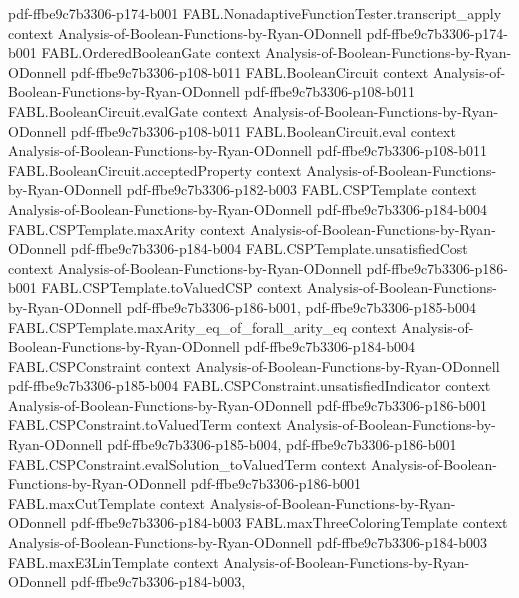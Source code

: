 \begin{theorem}
  {pdf-ffbe9c7b3306-p174-b001}
\proofstep
  {FABL.NonadaptiveFunctionTester.transcript_apply}
  {context}
  {Analysis-of-Boolean-Functions-by-Ryan-ODonnell}
  {pdf-ffbe9c7b3306-p174-b001}
\proofstep
  {FABL.OrderedBooleanGate}
  {context}
  {Analysis-of-Boolean-Functions-by-Ryan-ODonnell}
  {pdf-ffbe9c7b3306-p108-b011}
\proofstep
  {FABL.BooleanCircuit}
  {context}
  {Analysis-of-Boolean-Functions-by-Ryan-ODonnell}
  {pdf-ffbe9c7b3306-p108-b011}
\proofstep
  {FABL.BooleanCircuit.evalGate}
  {context}
  {Analysis-of-Boolean-Functions-by-Ryan-ODonnell}
  {pdf-ffbe9c7b3306-p108-b011}
\proofstep
  {FABL.BooleanCircuit.eval}
  {context}
  {Analysis-of-Boolean-Functions-by-Ryan-ODonnell}
  {pdf-ffbe9c7b3306-p108-b011}
\proofstep
  {FABL.BooleanCircuit.acceptedProperty}
  {context}
  {Analysis-of-Boolean-Functions-by-Ryan-ODonnell}
  {pdf-ffbe9c7b3306-p182-b003}
\proofstep
  {FABL.CSPTemplate}
  {context}
  {Analysis-of-Boolean-Functions-by-Ryan-ODonnell}
  {pdf-ffbe9c7b3306-p184-b004}
\proofstep
  {FABL.CSPTemplate.maxArity}
  {context}
  {Analysis-of-Boolean-Functions-by-Ryan-ODonnell}
  {pdf-ffbe9c7b3306-p184-b004}
\proofstep
  {FABL.CSPTemplate.unsatisfiedCost}
  {context}
  {Analysis-of-Boolean-Functions-by-Ryan-ODonnell}
  {pdf-ffbe9c7b3306-p186-b001}
\proofstep
  {FABL.CSPTemplate.toValuedCSP}
  {context}
  {Analysis-of-Boolean-Functions-by-Ryan-ODonnell}
  {pdf-ffbe9c7b3306-p186-b001,
    pdf-ffbe9c7b3306-p185-b004}
\proofstep
  {FABL.CSPTemplate.maxArity_eq_of_forall_arity_eq}
  {context}
  {Analysis-of-Boolean-Functions-by-Ryan-ODonnell}
  {pdf-ffbe9c7b3306-p184-b004}
\proofstep
  {FABL.CSPConstraint}
  {context}
  {Analysis-of-Boolean-Functions-by-Ryan-ODonnell}
  {pdf-ffbe9c7b3306-p185-b004}
\proofstep
  {FABL.CSPConstraint.unsatisfiedIndicator}
  {context}
  {Analysis-of-Boolean-Functions-by-Ryan-ODonnell}
  {pdf-ffbe9c7b3306-p186-b001}
\proofstep
  {FABL.CSPConstraint.toValuedTerm}
  {context}
  {Analysis-of-Boolean-Functions-by-Ryan-ODonnell}
  {pdf-ffbe9c7b3306-p185-b004,
    pdf-ffbe9c7b3306-p186-b001}
\proofstep
  {FABL.CSPConstraint.evalSolution_toValuedTerm}
  {context}
  {Analysis-of-Boolean-Functions-by-Ryan-ODonnell}
  {pdf-ffbe9c7b3306-p186-b001}
\proofstep
  {FABL.maxCutTemplate}
  {context}
  {Analysis-of-Boolean-Functions-by-Ryan-ODonnell}
  {pdf-ffbe9c7b3306-p184-b003}
\proofstep
  {FABL.maxThreeColoringTemplate}
  {context}
  {Analysis-of-Boolean-Functions-by-Ryan-ODonnell}
  {pdf-ffbe9c7b3306-p184-b003}
\proofstep
  {FABL.maxE3LinTemplate}
  {context}
  {Analysis-of-Boolean-Functions-by-Ryan-ODonnell}
  {pdf-ffbe9c7b3306-p184-b003,
}
\end{theorem}
